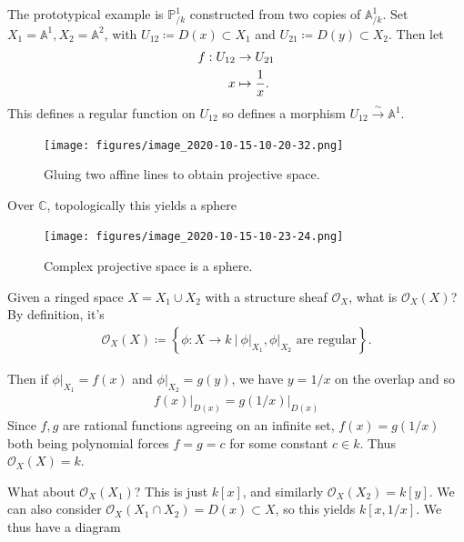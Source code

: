 \begin{example}

The prototypical example is \({\mathbb{P}}^1_{/k}\) constructed from two
copies of \({\mathbb{A}}^1_{/k}\). Set
\(X_1 = {\mathbb{A}}^1, X_2 = {\mathbb{A}}^2\), with
\(U_{12} \coloneqq D(x) \subset X_1\) and
\(U_{21} \coloneqq D(y) \subset X_2\). Then let
\begin{align*}  
f: U_{12} &\to U_{21} \\
x & \mapsto {1\over x}
.\end{align*}
This defines a regular function on \(U_{12}\) so defines a morphism
\(U_{12} \xrightarrow{\sim} {\mathbb{A}}^1\).

\begin{figure}
\centering
\texttt{[image: figures/image\_2020-10-15-10-20-32.png]}
\caption{Gluing two affine lines to obtain projective space.}
\end{figure}

Over \({\mathbb{C}}\), topologically this yields a sphere

\begin{figure}
\centering
\texttt{[image: figures/image\_2020-10-15-10-23-24.png]}
\caption{Complex projective space is a sphere.}
\end{figure}

Given a ringed space \(X = X_1\cup X_2\) with a structure sheaf
\({\mathcal{O}}_X\), what is \({\mathcal{O}}_X(X)\)? By definition, it's
\begin{align*}  
{\mathcal{O}}_X(X) \coloneqq\left\{{\phi: X\to k {~\mathrel{\Big|}~}{ \left.{{\phi}} \right|_{{X_1}} }, { \left.{{\phi}} \right|_{{X_2}} } \text{ are regular} }\right\}
.\end{align*}

Then if \({ \left.{{\phi}} \right|_{{X_1}} } = f(x)\) and
\({ \left.{{\phi}} \right|_{{X_2}} } = g(y)\), we have \(y=1/x\) on the
overlap and so
\begin{align*}
{ \left.{{f(x)}} \right|_{{D(x)}} } = { \left.{{g(1/x)}} \right|_{{D(x)}} }
\end{align*}
Since \(f, g\) are rational functions agreeing on an infinite set,
\(f(x) = g(1/x)\) both being polynomial forces \(f = g = c\) for some
constant \(c \in k\). Thus \({\mathcal{O}}_X(X) = k\).

What about \({\mathcal{O}}_X(X_1)\)? This is just \(k[x]\), and
similarly \({\mathcal{O}}_X(X_2) = k[y]\). We can also consider
\({\mathcal{O}}_X(X_1\cap X_2) = D(x) \subset X\), so this yields
\(k[x, 1/x]\). We thus have a diagram

\begin{center}
\end{center}

\end{example}

